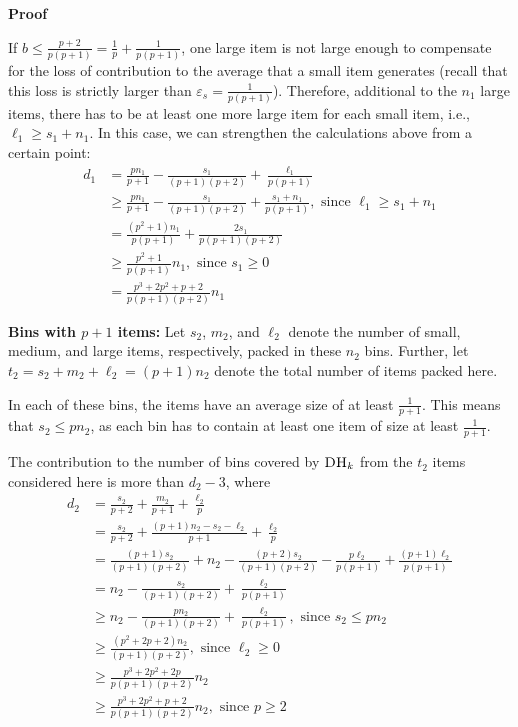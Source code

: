 \documentclass[11pt]{article}
\newenvironment{proof}{\begin{trivlist}\item[]{\bf Proof }}{\hspace*{\fill}\raisebox{-1pt}{\boldmath$\Box$}\end{trivlist}}
\newcommand{\DHk}{{\ensuremath{\textsc{DH}_k}}\xspace}
\newcommand{\p}{p}
\begin{document}
\begin{proof}
 
If $b \leq \frac{\p+2}{\p(\p+1)} = \frac{1}{\p} + \frac{1}{\p(\p+1)}$, 
 one large item is not large enough to compensate for the loss of contribution
to the average that a small item generates (recall that this loss is
strictly larger than $\varepsilon_s = \frac{1}{\p(\p+1)}$). Therefore,
additional to the $n_1$ large 
items, there has to be at least one more large item for each small
item, i.e., $\ell_1 \geq s_1 + n_1$.
In this case, we can strengthen the calculations above from a certain point:
\begin{align*}
 d_1
 & = \frac{\p n_1}{\p+1} - \frac{s_1}{(\p+1)(\p+2)} + \frac{\ell_1}{\p(\p+1)} \\
  & \geq \frac{\p n_1}{\p+1}-\frac{s_1}{(\p+1)(\p+2)}+\frac{s_1 + n_1}{\p(\p+1)}, \text{ since } \ell_1 \geq s_1 + n_1 \\
  & = \frac{(\p^2+1)n_1}{\p(\p+1)} +\frac{2s_1}{\p(\p+1)(\p+2)}\\
  & \geq \frac{\p^2+1}{\p(\p+1)}n_1, \text{ since } s_1 \geq 0 \\
& = \frac{\p^3+2\p^2+\p+2}{\p(\p+1)(\p+2)}n_1
\end{align*}

{\bf Bins with $\p+1$ items:}
Let $s_2$, $m_2$, and $\ell_2$ denote the number of small, medium, and
 large items, respectively, packed in these $n_2$ bins.
Further, let $t_2 = s_2 + m_2 + \ell_2 = (\p+1) n_2$ denote the total
 number of items packed here.
 
 In each of these bins, the items have an average size of at least
$\frac{1}{\p+1}$.
This means that $s_2 \leq \p n_2 $, as each bin has to contain at least one item of size at least $\frac{1}{\p+1}$. 

The contribution to the number of bins covered by \DHk from the $t_2$
items considered here is more than $d_2 -3$, where
\begin{align*}
  d_2
  & = \frac{s_2}{\p+2} + \frac{m_2}{\p+1} + \frac{\ell_2}{\p}\\
  & = \frac{s_2}{\p+2} + \frac{(\p+1)n_2-s_2-\ell_2}{\p+1} +
      \frac{\ell_2}{\p}\\
  & = \frac{(\p+1)s_2}{(\p+1)(\p+2)} + n_2 -
      \frac{(\p+2)s_2}{(\p+1)(\p+2)} - \frac{\p \ell_2}{\p(\p+1)} + \frac{(\p+1)\ell_2}{\p(\p+1)}\\
  & = n_2 - \frac{s_2}{(\p+1)(\p+2)} + \frac{\ell_2}{\p(\p+1)}\\
  & \geq n_2 - \frac{\p n_2}{(\p+1)(\p+2)} + \frac{\ell_2}{\p(\p+1)}, \text{ since } s_2 \leq \p n_2 \\
  & \geq \frac{(\p^2+2\p+2)n_2}{(\p+1)(\p+2)}, \text{ since } \ell_2 \geq 0 \\
& \geq \frac{\p^3+2\p^2+2\p}{\p(\p+1)(\p+2)}n_2 \\
  & \geq \frac{\p^3+2\p^2+\p+2}{\p(\p+1)(\p+2)}n_2, \text{ since } \p \geq 2 \\
\end{align*}


\end{proof}
\end{document}
